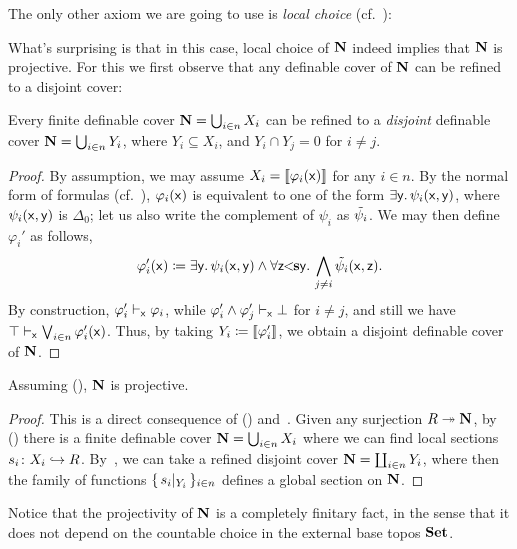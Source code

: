 The only other axiom we are going to use is \emph{local choice} (cf.~):

\PrintAxiomLC

What's surprising is that in this case, local choice of $\mathbf N$ indeed implies that $\mathbf N$ is projective. For this we first observe that any definable cover of $\mathbf N$ can be refined to a disjoint cover:

\begin{proposition}\label{prop:refinecover}
  Every finite definable cover $\mathbf N = \bigcup_{i\in n}X_i$ can be refined to a \emph{disjoint} definable cover $\mathbf N = \bigcup_{i\in n}Y_i$, where $Y_i \subseteq X_i$, and $Y_i \cap Y_j = 0$ for $i \neq j$.
\end{proposition}
\begin{proof}
  By assumption, we may assume $X_i = \llbracket\varphi_i(\mathsf{x})\rrbracket$ for any $i\in n$. By the normal form of formulas (cf.~), $\varphi_i(\mathsf{x})$ is equivalent to one of the form $\exists\mathsf{y}.\,\psi_i(\mathsf{x},\mathsf{y})$, where $\psi_i(\mathsf{x},\mathsf{y})$ is $\Delta_0$; let us also write the complement of $\psi_i$ as $\tilde{\psi_i}$. We may then define $\varphi_i'$ as follows,
  \[ \varphi_i'(\mathsf{x}) \coloneq \exists\mathsf{y}.\, \psi_i(\mathsf{x},\mathsf{y}) \wedge \forall \mathsf{z}\!\!<\!\!\mathbf{s}\mathsf{y}.\,\bigwedge_{j\neq i}\tilde{\psi_i}(\mathsf{x},\mathsf{z}). \]
  By construction, $\varphi_i' \vdash_{\mathsf{x}} \varphi_i$, while $\varphi_i' \wedge \varphi_j' \vdash_{\mathsf{x}} \bot$ for $i \neq j$, and still we have $\top \vdash_{\mathsf{x}} \bigvee_{i\in n} \varphi_i'(\mathsf{x})$. Thus, by taking $Y_i \coloneq \llbracket\varphi_i'\rrbracket$, we obtain a disjoint definable cover of $\mathbf N$.
\end{proof}

\begin{corollary}\label{cor:Nbisprojective}
  Assuming (\AxiomLC), $\mathbf N$ is projective.
\end{corollary}
\begin{proof}
  This is a direct consequence of (\AxiomLC) and~. Given any surjection $R \twoheadrightarrow \mathbf N$, by (\AxiomLC) there is a finite definable cover $\mathbf N = \bigcup_{i\in n}X_i$ where we can find local sections $s_i \colon X_i \hookrightarrow R$. By~, we can take a refined disjoint cover $\mathbf N = \coprod_{i\in n}Y_i$, where then the family of functions $\{\,s_i|_{Y_i}\,\}_{i\in n}$ defines a global section on $\mathbf N$.
\end{proof}

\begin{remark}
  Notice that the projectivity of $\mathbf N$ is a completely finitary fact, in the sense that it does not depend on the countable choice in the external base topos $\mathbf{Set}$. 
\end{remark}

